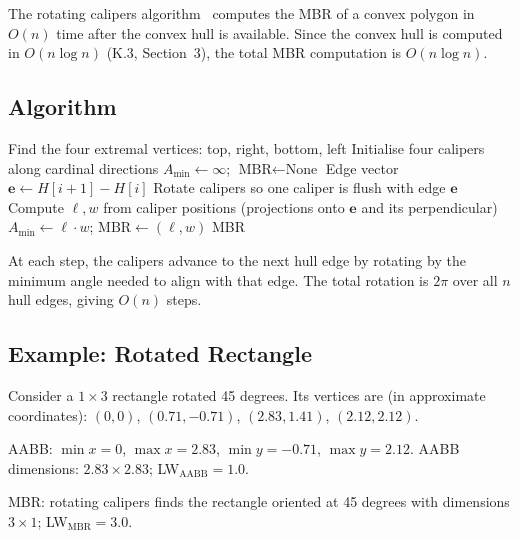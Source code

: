 The rotating calipers algorithm~\citep{toussaint1983solving} computes the MBR
of a convex polygon in $O(n)$ time after the convex hull is available.
Since the convex hull is computed in $O(n \log n)$ (K.3, Section~3),
the total MBR computation is $O(n \log n)$.

\subsection{Algorithm}

\begin{algorithm}
\caption{Rotating Calipers for Minimum Bounding Rectangle}
\label{alg:rotating_calipers}
\begin{algorithmic}[1]
  \State Find the four extremal vertices: top, right, bottom, left
  \State Initialise four calipers along cardinal directions
  \State $A_{\min} \gets \infty$; $\text{MBR} \gets \text{None}$
   
    \State Edge vector $\mathbf{e} \gets H[i+1] - H[i]$
    \State Rotate calipers so one caliper is flush with edge $\mathbf{e}$
    \State Compute $\ell, w$ from caliper positions (projections onto $\mathbf{e}$
      and its perpendicular)
      \State $A_{\min} \gets \ell \cdot w$; $\text{MBR} \gets (\ell, w)$
    \EndIf
  \EndFor
  \State \Return MBR
\EndFunction
\end{algorithmic}
\end{algorithm}

At each step, the calipers advance to the next hull edge by rotating by the
minimum angle needed to align with that edge.
The total rotation is $2\pi$ over all $n$ hull edges, giving $O(n)$ steps.

\subsection{Example: Rotated Rectangle}

Consider a $1 \times 3$ rectangle rotated 45 degrees.
Its vertices are (in approximate coordinates):
$(0,0)$, $(0.71, -0.71)$, $(2.83, 1.41)$, $(2.12, 2.12)$.

AABB: $\min x = 0$, $\max x = 2.83$, $\min y = -0.71$, $\max y = 2.12$.
AABB dimensions: $2.83 \times 2.83$; LW$_{\text{AABB}} = 1.0$.

MBR: rotating calipers finds the rectangle oriented at 45 degrees with
dimensions $3 \times 1$; LW$_{\text{MBR}} = 3.0$.


